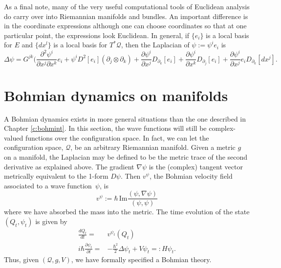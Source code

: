 \documentclass[11pt]{article}
\theoremstyle{remark}
\begin{document}
As a final note, many of the very useful computational tools of
Euclidean analysis do carry over into Riemannian manifolds and
bundles. An important difference is in the coordinate expressions
although one can choose coordinates so that at one particular point,
the expressions look Euclidean. In general, if
$\{e_i\}$ is a local basis for $E$ and $\{dx^l\}$ is a local basis for
\ensuremath{T^{*} \ensuremath{\mathcal{Q}}}, then  the Laplacian of $\ensuremath{\psi} \ensuremath{:=} \ensuremath{\psi}^i e_i$ is
\[
\ensuremath{\Delta} \ensuremath{\psi} = G^{\ensuremath{j} \ensuremath{k}} (\frac{\partial^2 \ensuremath{\psi}^i}{\partial{x^{\ensuremath{j}}}
  \partial{x^{\ensuremath{k}}}} e_i + \ensuremath{\psi}^i D^2 [e_i](\partial_{\ensuremath{j}}
  \otimes \partial_{\ensuremath{k}})  +  \frac{\partial \ensuremath{\psi}^i}{\partial{x^{\ensuremath{j}}}}
   D_{\partial_{\ensuremath{k}}} [e_i] +\frac{\partial \ensuremath{\psi}^i}{\partial{x^{\ensuremath{k}}}}
   D_{\partial_{\ensuremath{j}}} [e_i] 
+ \frac{\partial \ensuremath{\psi}^i}{\partial{x^\ensuremath{j}}}
  e_i 
D_{\partial_{\ensuremath{k}}} [dx^{\ensuremath{j}}] .      
\]


\section{Bohmian dynamics on manifolds} 
A Bohmian dynamics exists in more general situations than the one
described in Chapter \ref{c:bohmint}. In this section, the wave functions will
still be complex-valued functions over the configuration space. 
In fact, we can 
let the configuration space, \ensuremath{\mathcal{Q}}, be an arbitrary Riemannian manifold.
Given a 
metric $g$ on a manifold, the Laplacian may be defined to be
the metric trace of the  
second derivative as explained above. 
The    
 gradient $\nabla \ensuremath{\psi}$  is the (complex) tangent vector
metrically equivalent  to  
 the 1-form $D\ensuremath{\psi}$. Then  $v^{\ensuremath{\psi}}$, the Bohmian velocity field associated to a
wave function\ $\ensuremath{\psi}$,  is  
\begin{equation} \label{ie:rbv}
v^{\ensuremath{\psi}} \ensuremath{:=} \ensuremath{\hbar}\, \textrm{Im} \frac{\ensuremath{({\ensuremath{\psi}}, {\nabla \ensuremath{\psi}})}}{\ensuremath{({\ensuremath{\psi}}, {\ensuremath{\psi}})}}
\end{equation} 
where we have absorbed the mass into the metric.
The time evolution of 
the state $(Q_t, \ensuremath{\psi}_t)$ is given by
\begin{subequations} \label{ie:re}
\begin{align} 
\ensuremath{\frac{d{Q_t}}{d{t}}} =& v^{\ensuremath{\psi}_t}(Q_t)\label{ie:rbe} \\
i \ensuremath{\hbar} \ensuremath{\frac{\partial {\ensuremath{\psi}_t}}{\partial {t}}}  = &- \frac{\ensuremath{\hbar}^2}{2} \ensuremath{\Delta} \ensuremath{\psi}_t  + V \ensuremath{\psi}_t
 \ensuremath{=:} H \ensuremath{\psi}_t.\label{ie:rse}
\end{align}
\end{subequations}
Thus, given $(\ensuremath{\mathcal{Q}}, g, V)$, we have formally specified 
a Bohmian theory.  
\end{document}

